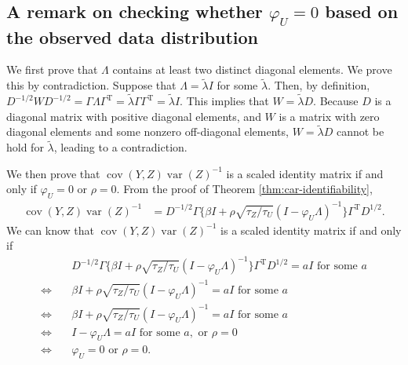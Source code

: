 \documentclass[11pt]{article}
\theoremstyle{definition}
\theoremstyle{remark}
\DeclareMathOperator{\var}{var}
\DeclareMathOperator{\cov}{cov}
\def\top{{ \mathrm{\scriptscriptstyle T} }}
\begin{document}
\subsection{A remark on checking whether $\varphi_U=0$ based on the observed data distribution}

We first prove that $\Lambda$ contains at least two distinct diagonal elements. We prove this by contradiction. 
Suppose that $\Lambda = \tilde{\lambda} I$ for some $\tilde{\lambda}$. Then, by definition, 
$D^{-1/2} W D^{-1/2} = \Gamma \Lambda \Gamma^\top = \tilde{\lambda} \Gamma \Gamma^\top = \tilde{\lambda} I$. 
This implies that 
$W = \tilde{\lambda} D$.
Because $D$ is a diagonal matrix with positive diagonal elements, and $W$ is a matrix with zero diagonal elements and some nonzero off-diagonal elements, $W = \tilde{\lambda} D$ cannot be hold for $\tilde{\lambda}$, leading to a contradiction. 

We then prove that $\cov(Y,Z) \var(Z)^{-1}$ is a scaled identity matrix if and only if $\varphi_U=0$ or $\rho = 0$. 
From the proof of Theorem \ref{thm:car-identifiability}, 
\begin{align*}
    \cov(Y,Z) \var(Z)^{-1} &
     =D^{-1/2} \Gamma
    \big\{ \beta I +\rho \sqrt{\tau_Z/\tau_U} (I-\varphi_U \Lambda)^{-1} \big\} 
    \Gamma^{\top} D^{1/2}. 
\end{align*}
We can know that $\cov(Y,Z) \var(Z)^{-1}$ is a scaled identity matrix if and only if 
\begin{align*}
    & D^{-1/2} \Gamma
    \big\{ \beta I +\rho \sqrt{\tau_Z/\tau_U} (I-\varphi_U \Lambda)^{-1} \big\} 
    \Gamma^{\top} D^{1/2}
    = aI \text{ for some } a
    \\
    \Longleftrightarrow \quad  
    & 
    \beta I +\rho \sqrt{\tau_Z/\tau_U} (I-\varphi_U \Lambda)^{-1} 
    = aI \text{ for some } a
    \\
    \Longleftrightarrow \quad  
    & 
    \beta I +\rho \sqrt{\tau_Z/\tau_U} (I-\varphi_U \Lambda)^{-1} 
    = aI \text{ for some } a
    \\
    \Longleftrightarrow \quad  
    & 
    I-\varphi_U \Lambda
    = aI \text{ for some } a, \text{ or } \rho = 0\\
    \Longleftrightarrow \quad  
    & 
    \varphi_U = 0 \text{ or } \rho = 0. 
\end{align*}
\end{document}
